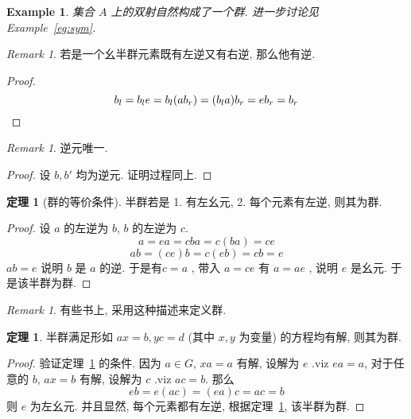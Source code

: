 \documentclass[12pt]{ctexart}
\theoremstyle{definition}
\theoremstyle{definition}
\newtheorem{thm}[definition]{定理}
\theoremstyle{plain}
\newtheorem{exam}[definition]{Example}
\theoremstyle{remark}
\newtheorem{remark}[definition]{Remark}
\begin{document}
\begin{exam}
	集合 \(A\) 上的双射自然构成了一个群. 进一步讨论见 Example~\ref{eg:sym}.
\end{exam}
\begin{remark}
若是一个幺半群元素既有左逆又有右逆, 那么他有逆.
\end{remark}
\begin{proof}
\begin{equation*}
b_{l} = b_{l} e = b_{l} (a b_{r}) = (b_{l} a) b_{r} = e b_{r} = b_{r}\qedhere
\end{equation*}
\end{proof}
\begin{remark}
逆元唯一.  
\end{remark}
\begin{proof}
设 \(b, b'\) 均为逆元. 证明过程同上.
\end{proof}

\begin{thm}[群的等价条件]\label{thm:dengjia}
半群若是 1. 有左幺元, 2. 每个元素有左逆, 则其为群.
\end{thm}
\begin{proof}
设 \(a\) 的左逆为 \(b\), \(b\) 的左逆为 \(c\). 
\begin{equation}
a = ea = c b a  = c ( ba) = c e
\end{equation}
\begin{equation}
ab =  (ce) b = c(eb) =  cb  = e 
\end{equation}
\(ab  = e\) 说明 \(b\) 是 \(a \) 的逆. 于是有\(c = a\) , 带入 \(a = ce\) 有 \(a =  a e \) , 说明 \(e\) 是幺元. 于是该半群为群.
\end{proof}
\begin{remark}
有些书上, 采用这种描述来定义群.
\end{remark}

\begin{thm}
半群满足形如 \(a x = b , y c = d\)  (其中 \(x, y\) 为变量) 的方程均有解, 则其为群.
\end{thm}
\begin{proof}
	验证定理~\ref{thm:dengjia} 的条件. 因为
	\(a \in G \), \(x a = a\)  有解, 设解为 \(e\) .viz \(e a = a\), 对于任意的 \(b\), \(a x = b\) 有解, 设解为 \(c\) .viz \(a c =b\). 
	那么
	\begin{equation}
	e b = e (ac ) = (e a) c = ac = b 
	\end{equation}
	则 \(e\) 为左幺元. 并且显然, 每个元素都有左逆, 根据定理~\ref{thm:dengjia}, 该半群为群.
\end{proof}
\end{document}
